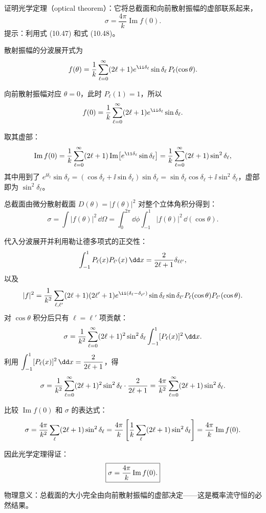 \begin{question}
证明光学定理（optical theorem）：它将总截面和向前散射振幅的虚部联系起来，
\[
\sigma=\frac{4\pi}{k}\operatorname{Im} f(0).
\]
提示：利用式 (10.47) 和式 (10.48)。

\par\smallskip
{}

\end{question}
\begin{solution}
散射振幅的分波展开式为
\[
f(\theta)={1\over k}\sum_{\ell=0}^{\infty}(2\ell+1)e^{\ii\delta_\ell}\sin\delta_\ell\,P_\ell(\cos\theta).
\]

向前散射振幅对应 $\theta=0$，此时 $P_\ell(1)=1$，所以
\[
f(0)={1\over k}\sum_{\ell=0}^{\infty}(2\ell+1)e^{\ii\delta_\ell}\sin\delta_\ell.
\]

取其虚部：
\[
\operatorname{Im}f(0)={1\over k}\sum_{\ell=0}^{\infty}(2\ell+1)\operatorname{Im}\bigl[e^{\ii\delta_\ell}\sin\delta_\ell\bigr]
={1\over k}\sum_{\ell=0}^{\infty}(2\ell+1)\sin^2\delta_\ell,
\]
其中用到了 $e^{\ii\delta_\ell}\sin\delta_\ell=(\cos\delta_\ell+\ii\sin\delta_\ell)\sin\delta_\ell=\sin\delta_\ell\cos\delta_\ell+\ii\sin^2\delta_\ell$，虚部即为 $\sin^2\delta_\ell$。

总截面由微分散射截面 $D(\theta)=|f(\theta)|^2$ 对整个立体角积分得到：
\[
\sigma=\int|f(\theta)|^2\,\dd\Omega
=\int_0^{2\pi}\dd\phi\int_{-1}^{1}|f(\theta)|^2\,\dd(\cos\theta).
\]

代入分波展开并利用勒让德多项式的正交性：
\[
\int_{-1}^{1}P_\ell(x)P_{\ell'}(x)\,\dd x={2\over2\ell+1}\delta_{\ell\ell'},
\]
以及
\[
|f|^2={1\over k^2}\sum_{\ell,\ell'}(2\ell+1)(2\ell'+1)e^{\ii(\delta_\ell-\delta_{\ell'})}\sin\delta_\ell\sin\delta_{\ell'}P_\ell(\cos\theta)P_{\ell'}(\cos\theta).
\]
对 $\cos\theta$ 积分后只有 $\ell=\ell'$ 项贡献：
\[
\sigma={1\over k^2}\sum_{\ell=0}^{\infty}(2\ell+1)^2\sin^2\delta_\ell\int_{-1}^{1}[P_\ell(x)]^2\,\dd x.
\]
利用 $\displaystyle\int_{-1}^{1}[P_\ell(x)]^2\,\dd x={2\over2\ell+1}$，得
\[
\sigma={1\over k^2}\sum_{\ell=0}^{\infty}(2\ell+1)^2\sin^2\delta_\ell\cdot{2\over2\ell+1}
={4\pi\over k^2}\sum_{\ell=0}^{\infty}(2\ell+1)\sin^2\delta_\ell.
\]

比较 $\operatorname{Im}f(0)$ 和 $\sigma$ 的表达式：
\[
\sigma={4\pi\over k^2}\sum_{\ell}(2\ell+1)\sin^2\delta_\ell
={4\pi\over k}\left[{1\over k}\sum_{\ell}(2\ell+1)\sin^2\delta_\ell\right]
={4\pi\over k}\operatorname{Im}f(0).
\]

因此光学定理得证：
\[
\boxed{\sigma={4\pi\over k}\operatorname{Im}f(0).}
\]

物理意义：总截面的大小完全由向前散射振幅的虚部决定——这是概率流守恒的必然结果。
\end{solution}

